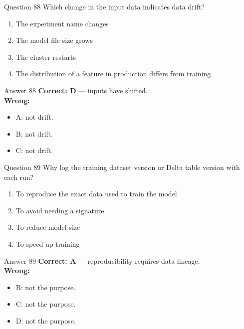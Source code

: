 \documentclass[aspectratio=169,11pt]{beamer}
\begin{document}
\begin{frame}{Question 88}
Which change in the input data indicates data drift?
\begin{enumerate}[label=\Alph*.]
\item The experiment name changes
\item The model file size grows
\item The cluster restarts
\item The distribution of a feature in production differs from training
\end{enumerate}
\end{frame}
\begin{frame}{Answer 88}
\textbf{Correct: D} --- inputs have shifted.\\
\vspace{0.5em}
\textbf{Wrong:}
\begin{itemize}
\item A: not drift.
\item B: not drift.
\item C: not drift.
\end{itemize}
\end{frame}

\begin{frame}{Question 89}
Why log the training dataset version or Delta table version with each run?
\begin{enumerate}[label=\Alph*.]
\item To reproduce the exact data used to train the model
\item To avoid needing a signature
\item To reduce model size
\item To speed up training
\end{enumerate}
\end{frame}
\begin{frame}{Answer 89}
\textbf{Correct: A} --- reproducibility requires data lineage.\\
\vspace{0.5em}
\textbf{Wrong:}
\begin{itemize}
\item B: not the purpose.
\item C: not the purpose.
\item D: not the purpose.
\end{itemize}
\end{frame}
\end{document}
